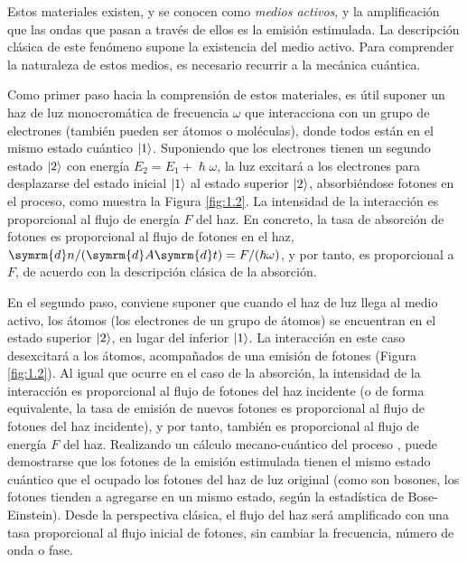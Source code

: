 Estos materiales existen, y se conocen como \emph{medios activos}, y la amplificación que las ondas que pasan a través de ellos es la emisión estimulada. La descripción clásica de este fenómeno supone la existencia del medio activo. Para comprender la naturaleza de estos medios, es necesario recurrir a la mecánica cuántica.

Como primer paso hacia la comprensión de estos materiales, es útil suponer un haz de luz monocromática de frecuencia $\omega$ que interacciona con un grupo de electrones (también pueden ser átomos o moléculas), donde todos están en el mismo estado cuántico $|1\rangle$. Suponiendo que los electrones tienen un segundo estado $|2\rangle$ con energía $E_{2} = E_{1} + \hslash \omega$, la luz excitará a los electrones para desplazarse del estado inicial $|1\rangle$ al estado superior $|2\rangle$, absorbiéndose fotones en el proceso, como muestra la Figura \ref{fig:1.2}. La intensidad de la interacción es proporcional al flujo de energía $F$ del haz. En concreto, la tasa de absorción de fotones es proporcional al flujo de fotones en el haz, $\symrm{d}n/(\symrm{d}A \symrm{d}t) = F/(\hslash \omega)$, y por tanto, es proporcional a $F$, de acuerdo con la descripción clásica de la absorción.

En el segundo paso, conviene suponer que cuando el haz de luz llega al medio activo, los átomos (los electrones de un grupo de átomos) se encuentran en el estado superior $|2\rangle$, en lugar del inferior $|1\rangle$. La interacción en este caso desexcitará a los átomos, acompañados de una emisión de fotones (Figura \ref{fig:1.2}). Al igual que ocurre en el caso de la absorción, la intensidad de la interacción es proporcional al flujo de fotones del haz incidente (o de forma equivalente, la tasa de emisión de nuevos fotones es proporcional al flujo de fotones del haz incidente), y por tanto, también es proporcional al flujo de energía $F$ del haz. Realizando un cálculo mecano-cuántico del proceso \autocite{Schwartz2013}, puede demostrarse que los fotones de la emisión estimulada tienen el mismo estado cuántico que el ocupado los fotones del haz de luz original (como son bosones, los fotones tienden a agregarse en un mismo estado, según la estadística de Bose-Einstein). Desde la perspectiva clásica, el flujo del haz será amplificado con una tasa proporcional al flujo inicial de fotones, sin cambiar la frecuencia, número de onda o fase.

